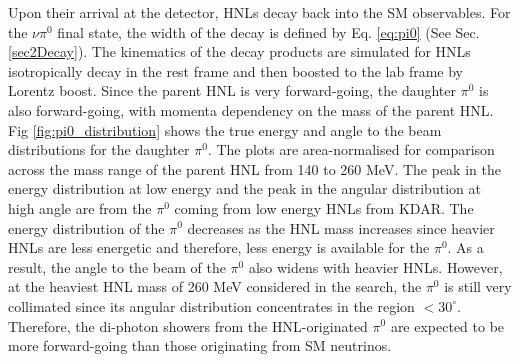 Upon their arrival at the detector, HNLs decay back into the SM observables.
For the $\nu\pi^{0}$ final state, the width of the decay is defined by Eq. \ref{eq:pi0} (See Sec. \ref{sec2Decay}).
The kinematics of the decay products are simulated for HNLs isotropically decay in the rest frame and then boosted to the lab frame by Lorentz boost.
Since the parent HNL is very forward-going, the daughter $\pi^0$ is also forward-going, with momenta dependency on the mass of the parent HNL. 
Fig \ref{fig:pi0_distribution} shows the true energy and angle to the beam distributions for the daughter $\pi^0$.
The plots are area-normalised for comparison across the mass range of the parent HNL from 140 to 260 MeV. 
The peak in the energy distribution at low energy and the peak in the angular distribution at high angle are from the $\pi^0$ coming from low energy HNLs from KDAR.
The energy distribution of the $\pi^0$ decreases as the HNL mass increases since heavier HNLs are less energetic and therefore, less energy is available for the $\pi^0$.
As a result, the angle to the beam of the $\pi^0$ also widens with heavier HNLs.
However, at the heaviest HNL mass of 260 MeV considered in the search, the $\pi^0$ is still very collimated since its angular distribution concentrates in the region $< 30^\circ$. 
Therefore, the di-photon showers from the HNL-originated $\pi^0$ are expected to be more forward-going than those originating from SM neutrinos.

